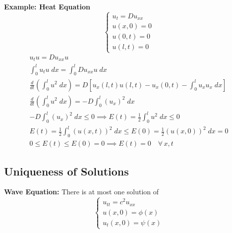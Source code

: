 \documentclass[10pt]{article}
\begin{document}
\textbf{Example: Heat Equation} 
\[\begin{cases}
    u_t = Du_{xx}\\
    u(x, 0) = 0\\
    u(0, t) =0\\
    u(l, t) = 0
\end{cases}\]
\begin{gather*}
    u_t u = Du_{xx} u\\
    \int_0^l u_t u\; dx = \int_0^l Du_{xx} u\; dx\\
    \frac{d}{dt}\left(\int_0^l u^2\; dx\right) = D\left[u_x(l, t) u(l, t) - u_x(0, t) - \int_0^l u_x u_x\; dx\right]\\
    \frac{d}{dt}\left(\int_0^l u^2 \; dx\right) = -D\int_0^l (u_x)^2\; dx\\
    -D\int_0^l (u_x)^2\; dx \leq 0 \implies E(t) = \frac{1}{2}\int_0^l u^2\; dx \leq 0\\
    E(t) = \frac{1}{2}\int_0^l (u(x, t))^2\; dx \leq E(0) = \frac{1}{2}(u(x, 0))^2\; dx = 0\\
    0 \leq E(t) \leq E(0) = 0 \implies E(t) = 0 \quad \forall\, x, t
\end{gather*}

\subsection{Uniqueness of Solutions}
\textbf{Wave Equation:}
There is at most one solution of 
\[\begin{cases}
    u_{tt} = c^2 u_{xx}\\
    u(x, 0) = \phi(x)\\
    u_t(x, 0) = \psi(x)
\end{cases}\]
\end{document}
